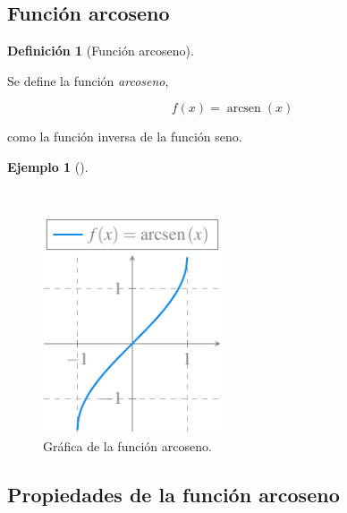 \documentclass[
  a4paper,
]{scrreport}
\theoremstyle{definition}
\newtheorem{example}{Ejemplo}[chapter]
\theoremstyle{plain}
\theoremstyle{definition}
\newtheorem{definition}{Definición}[chapter]
\theoremstyle{definition}
\theoremstyle{plain}
\theoremstyle{plain}
\theoremstyle{remark}
\begin{document}
\subsection{Función arcoseno}\label{funciuxf3n-arcoseno}

\begin{definition}[Función
arcoseno]\protect\hypertarget{def-funcion-arcoseno}{}\label{def-funcion-arcoseno}

Se define la función \emph{arcoseno},

\[f(x)=\operatorname{arcsen}(x)\]

como la función inversa de la función seno.

\end{definition}

\begin{example}[]\protect\hypertarget{exm-funcion-arcoseno}{}\label{exm-funcion-arcoseno}

~

\begin{figure}[H]

{\centering \includegraphics[width=2.08333in,height=\textheight]{./img/funciones/funcion-arcoseno.pdf}

}

\caption{Gráfica de la función arcoseno.}

\end{figure}%

\end{example}

\subsection{Propiedades de la función
arcoseno}\label{propiedades-de-la-funciuxf3n-arcoseno}
\end{document}
